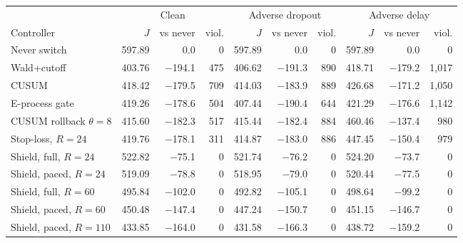 \begin{tabular}{@{}l r r r r r r r r r @{}}
\toprule
 & \multicolumn{3}{c}{Clean} & \multicolumn{3}{c}{Adverse dropout} & \multicolumn{3}{c}{Adverse delay} \\
\cmidrule(lr){2-4}\cmidrule(lr){5-7}\cmidrule(lr){8-10}
Controller & $J$ & vs never & viol. & $J$ & vs never & viol. & $J$ & vs never & viol. \\
\midrule
Never switch & 597.89 & 0.0 & 0 & 597.89 & 0.0 & 0 & 597.89 & 0.0 & 0 \\
Wald+cutoff & 403.76 & $-$194.1 & 475 & 406.62 & $-$191.3 & 890 & 418.71 & $-$179.2 & 1{,}017 \\
CUSUM & 418.42 & $-$179.5 & 709 & 414.03 & $-$183.9 & 889 & 426.68 & $-$171.2 & 1{,}050 \\
E-process gate & 419.26 & $-$178.6 & 504 & 407.44 & $-$190.4 & 644 & 421.29 & $-$176.6 & 1{,}142 \\
CUSUM rollback $\theta=8$ & 415.60 & $-$182.3 & 517 & 415.44 & $-$182.4 & 884 & 460.46 & $-$137.4 & 980 \\
Stop-loss, $R=24$ & 419.76 & $-$178.1 & 311 & 414.87 & $-$183.0 & 886 & 447.45 & $-$150.4 & 979 \\
\midrule
Shield, full, $R=24$ & 522.82 & $-$75.1 & 0 & 521.74 & $-$76.2 & 0 & 524.20 & $-$73.7 & 0 \\
Shield, paced, $R=24$ & 519.09 & $-$78.8 & 0 & 518.95 & $-$79.0 & 0 & 520.44 & $-$77.5 & 0 \\
Shield, full, $R=60$ & 495.84 & $-$102.0 & 0 & 492.82 & $-$105.1 & 0 & 498.64 & $-$99.2 & 0 \\
Shield, paced, $R=60$ & 450.48 & $-$147.4 & 0 & 447.24 & $-$150.7 & 0 & 451.15 & $-$146.7 & 0 \\
Shield, paced, $R=110$ & 433.85 & $-$164.0 & 0 & 431.58 & $-$166.3 & 0 & 438.72 & $-$159.2 & 0 \\
\bottomrule
\end{tabular}
